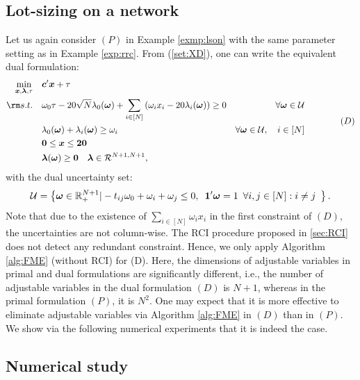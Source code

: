 \documentclass[fleqn,mnsc,blindrev]{informs4}
\newcommand{\mb}[1]{\mbox{\boldmath \ensuremath{#1}}}
\begin{document}
		\subsection{Lot-sizing on a network} \label{sec:lsonproblem}
		
		Let us again consider $(P)$ in Example \ref{exmp:lson} with the same parameter setting as in Example \ref{exp:rrc}. From (\ref{set:XD}), one can write the equivalent dual formulation:
\begin{equation*}%
			\begin{aligned} 
				\min_{ \boldsymbol{x} ,\boldsymbol{\lambda}, \tau} \quad &  \mb{c}'\mb{x} + \tau \\
				{\rm s.t.}  \quad & \omega_0\tau - 20\sqrt{N}\lambda_0(\mb{\omega}) + \sum_{i\in [N]}  \left(  \omega_i x_i - 20\lambda_i(\mb{\omega})  \right)  \ge 0   & \forall \mb{\omega} \in \mathcal{U} \\
				\quad & \lambda_0(\mb{\omega}) + \lambda_i (\mb{\omega})\ge \omega_i & \forall \mb{\omega} \in \mathcal{U}, \quad i \in [N]\\
				\quad &   \mb{0}\le \mb{x} \le \mb{20}\\
				\quad & \boldsymbol{\lambda}(\mb{\omega}) \ge \mb{0}	\quad  \mb{\lambda} \in \mathcal{R}^{N+1,N+1},
			\end{aligned} \qquad \qquad (D)
\end{equation*}
		with the dual uncertainty set:
\begin{equation*}
		\mathcal{U}=\left\{ \mb{\omega} \in \mathbb{R}^{N+1}_+| -t_{ij}\omega_0 + \omega_i + \omega_j \le 0, \,\,\, \boldsymbol{1}'\boldsymbol{\omega} = 1 \,\,\, \forall i,j \in [N]: i\ne j \,\,\, \right\}.
\end{equation*}
		Note that due to the existence of  $\sum_{i\in [N]} \omega_i x_i$ in the first constraint of $(D)$, the uncertainties are not column-wise. The RCI procedure proposed in \textsection \ref{sec:RCI} does not detect any redundant constraint. Hence, we only apply Algorithm \ref{alg:FME} (without RCI) for (D). Here, the dimensions of adjustable variables in primal and dual formulations are significantly different, i.e., the number of adjustable variables in the dual formulation $(D)$ is $N+1$, whereas in the primal formulation $(P)$, it is $N^2$. One may expect that it is more effective to eliminate adjustable variables via Algorithm \ref{alg:FME} in $(D)$ than in  $(P)$. We show via the following numerical experiments that it is indeed the case.
		
		\subsection*{Numerical study}
	
\end{document}
